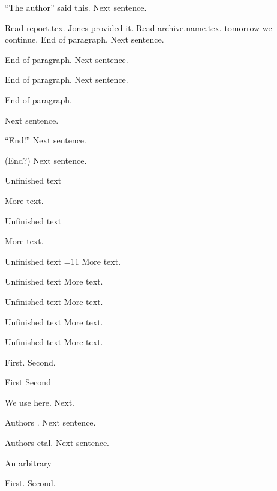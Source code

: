 \enquote{The author} said this. Next sentence.

Read report.tex. Jones provided it.
Read archive.name.tex. tomorrow we continue.
End of paragraph.
\vspace{1em}
Next sentence.

End of paragraph.
\bigskip
Next sentence.

End of paragraph.
\newpage
Next sentence.

End of paragraph.

Next sentence.

“End!”
\vspace{1em}
Next sentence.

(End?)
\vspace{1em}
Next sentence.

Unfinished text

More text.

Unfinished text

More text.

Unfinished text
=11
More text.

Unfinished text
\def\x{value}
More text.

Unfinished text
\gdef\x{value}
More text.

Unfinished text
\edef\x{value}
More text.

Unfinished text
\xdef\x{value}
More text.

\newenvironment{local}{}{}
\begin{local}
First. Second.
\end{local}

\begin{itemize}
\myitem First
\myitem Second
\end{itemize}

We use
here. Next.

Authors \etal. Next sentence.

Authors etal. Next sentence.

An arbitrary \macro [0,1) works. Next sentence.

\newtheorem{localnumbered}{Local}
\begin{localnumbered}
First. Second.
\end{localnumbered}

\newtheorem*{localstar}{Local}
\begin{localstar}
First. Second.
\end{localstar}

\declaretheorem[title={a ] b}]{localdeclared}
\begin{localdeclared}
First. Second.
\end{localdeclared}

